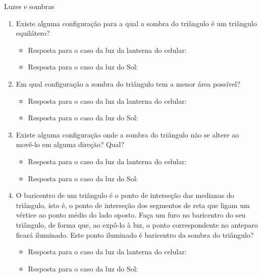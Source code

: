 \begin{task}{Luzes e sombras}
\begin{enumerate}
\item {} 
Existe alguma configuração para a qual a sombra do triângulo é um triângulo equilátero?
\begin{itemize}
\item {} 
Resposta para o caso da luz da lanterna do celular:

\item {} 
Resposta para o caso da luz do Sol:

\end{itemize}

\item {} 
Em qual configuração a sombra do triângulo tem a menor área possível?
\begin{itemize}
\item {} 
Resposta para o caso da luz da lanterna do celular:

\item {} 
Resposta para o caso da luz do Sol:

\end{itemize}

\item {} 
Existe alguma configuração onde a sombra do triângulo não se altere ao movê-lo em alguma direção? Qual?
\begin{itemize}
\item {} 
Resposta para o caso da luz da lanterna do celular:

\item {} 
Resposta para o caso da luz do Sol:

\end{itemize}

\item {} 
O baricentro de um triângulo é o  ponto de interseção das medianas do triângulo, isto é, o ponto de interseção dos segmentos de reta que ligam um vértice ao ponto médio do lado oposto. Faça um furo no baricentro do seu triângulo, de forma que, ao expô-lo à luz, o ponto correspondente no anteparo ficará iluminado. Este ponto iluminado é baricentro da sombra do triângulo?
\begin{itemize}
\item {} 
Resposta para o caso da luz da lanterna do celular:

\item {} 
Resposta para o caso da luz do Sol:

\end{itemize}

\end{enumerate}


\end{task}
